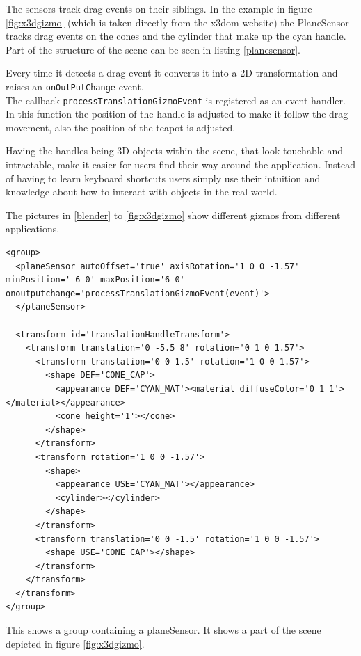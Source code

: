 The sensors track drag events on their siblings. In the example in figure
\ref{fig:x3dgizmo} (which is taken directly from the x3dom website) the
PlaneSensor tracks drag events on the cones and the cylinder that make up the
cyan handle. Part of the structure of the scene can be seen in listing
\ref{planesensor}.

Every time it detects a drag event it converts it into a 2D
transformation and raises an \texttt{onOutPutChange} event.\\
The callback \texttt{processTranslationGizmoEvent} is registered as an event handler.
In this function the position of the handle is adjusted to make it
follow the drag movement, also the position of the teapot is adjusted.

Having the handles being \gls{3D} objects within the scene, that look
touchable and intractable, make it easier for users find their way
around the application. Instead of having to learn keyboard shortcuts
users simply use their intuition and knowledge about how to interact with
objects in the real world.

The pictures in \ref{blender} to \ref{fig:x3dgizmo} show different gizmos from
different applications.

\begin{listing}
  \begin{verbatim}
<group>
  <planeSensor autoOffset='true' axisRotation='1 0 0 -1.57' minPosition='-6 0' maxPosition='6 0' onoutputchange='processTranslationGizmoEvent(event)'>
  </planeSensor>

  <transform id='translationHandleTransform'>
    <transform translation='0 -5.5 8' rotation='0 1 0 1.57'>
      <transform translation='0 0 1.5' rotation='1 0 0 1.57'>
        <shape DEF='CONE_CAP'>
          <appearance DEF='CYAN_MAT'><material diffuseColor='0 1 1'></material></appearance>
          <cone height='1'></cone>
        </shape>
      </transform>
      <transform rotation='1 0 0 -1.57'>
        <shape>
          <appearance USE='CYAN_MAT'></appearance>
          <cylinder></cylinder>
        </shape>
      </transform>
      <transform translation='0 0 -1.5' rotation='1 0 0 -1.57'>
        <shape USE='CONE_CAP'></shape>
      </transform>
    </transform>
  </transform>
</group>
  \end{verbatim}
  \caption{This shows a group containing a planeSensor. It shows a part of the scene depicted in figure \ref{fig:x3dgizmo}.}
  \label{planesensor}
\end{listing}

